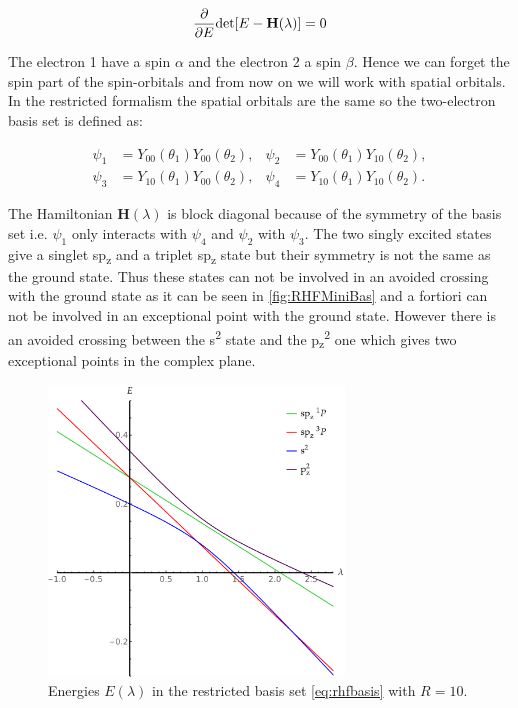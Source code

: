 \documentclass[11pt,a4paper]{article}
\newcommand{\bH}{\mathbf{H}}
\begin{document}
\begin{equation}\label{eq:DPolChar}
\pdv{E}\text{det}[E-\bH(\lambda)]=0
\end{equation}

The electron 1 have a spin $\alpha$ and the electron 2 a spin $\beta$. Hence we can forget the spin part of the spin-orbitals and from now on we will work with spatial orbitals. In the restricted formalism the spatial orbitals are the same so the two-electron basis set is defined as:

\begin{align}\label{eq:rhfbasis}
 \psi_1 & =Y_{00}(\theta_1)Y_{00}(\theta_2),
 & 
 \psi_2 & =Y_{00}(\theta_1)Y_{10}(\theta_2),\\
 \psi_3 & =Y_{10}(\theta_1)Y_{00}(\theta_2),
 & 
 \psi_4 & =Y_{10}(\theta_1)Y_{10}(\theta_2).
\end{align}

The Hamiltonian $\bH(\lambda)$ is block diagonal because of the symmetry of the basis set i.e. $\psi_1$ only interacts with $\psi_4$ and $\psi_2$ with $\psi_3$. The two singly excited states give a singlet sp\textsubscript{z} and a triplet sp\textsubscript{z} state but their symmetry is not the same as the ground state. Thus these states can not be involved in an avoided crossing with the ground state as it can be seen in \autoref{fig:RHFMiniBas} and a fortiori can not be involved in an exceptional point with the ground state. However there is an avoided crossing between the s\textsuperscript{2} state and the p\textsubscript{z}\textsuperscript{2} one which gives two exceptional points in the complex plane. 

\begin{figure}[h!]
    \centering
    \includegraphics[width=0.7\textwidth]{EMP_RHF_R10.pdf}
    \caption{\centering Energies $E(\lambda)$ in the restricted basis set \eqref{eq:rhfbasis} with $R=10$.}
    \label{fig:RHFMiniBas}
\end{figure}
\end{document}
